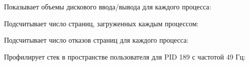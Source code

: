 \noindent Показывает объемы дискового ввода/вывода для каждого процесса: \\

\noindent Подсчитывает число страниц, загруженных каждым процессом: \\

\noindent Подсчитывает число отказов страниц для каждого процесса: \\

\noindent Профилирует стек в пространстве пользователя для PID 189 с частотой 49 Гц: \\
